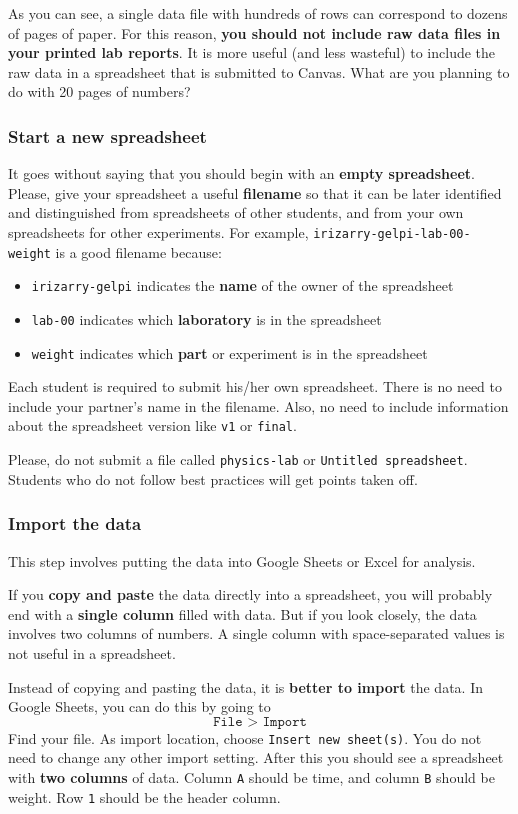 As you can see, a single data file with hundreds of rows can correspond to dozens of pages of paper. For this reason, \textbf{you should not include raw data files in your printed lab reports}. It is more useful (and less wasteful) to include the raw data in a spreadsheet that is submitted to Canvas. What are you planning to do with 20 pages of numbers?
%
\subsubsection{Start a new spreadsheet}
%
It goes without saying that you should begin with an \textbf{empty spreadsheet}. Please, give your spreadsheet a useful \textbf{filename} so that it can be later identified and distinguished from spreadsheets of other students, and from your own spreadsheets for other experiments. For example, \texttt{irizarry-gelpi-lab-00-weight} is a good filename because:
\begin{itemize}
    \item \texttt{irizarry-gelpi} indicates the \textbf{name} of the owner of the spreadsheet
    \item \texttt{lab-00} indicates which \textbf{laboratory} is in the spreadsheet
    \item \texttt{weight} indicates which \textbf{part} or experiment is in the spreadsheet
\end{itemize}
Each student is required to submit his/her own spreadsheet. There is no need to include your partner's name in the filename. Also, no need to include information about the spreadsheet version like \texttt{v1} or \texttt{final}.

Please, do not submit a file called \texttt{physics-lab} or \texttt{Untitled spreadsheet}. Students who do not follow best practices will get points taken off.
%
\subsubsection{Import the data}
%
This step involves putting the data into Google Sheets or Excel for analysis.

If you \textbf{copy and paste} the data directly into a spreadsheet, you will probably end with a \textbf{single column} filled with data. But if you look closely, the data involves two columns of numbers. A single column with space-separated values is not useful in a spreadsheet.

Instead of copying and pasting the data, it is \textbf{better to import} the data. In Google Sheets, you can do this by going to
\begin{equation}
    \texttt{File > Import}
\end{equation}
Find your file. As import location, choose \texttt{Insert new sheet(s)}. You do not need to change any other import setting. After this you should see a spreadsheet with \textbf{two columns} of data. Column \texttt{A} should be time, and column \texttt{B} should be weight. Row \texttt{1} should be the header column.


